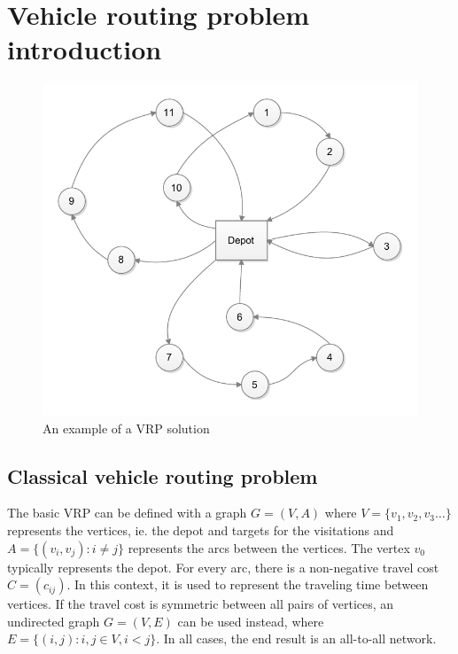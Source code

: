 \chapter{Vehicle routing problem introduction}
\label{chapter:background} 

\begin{figure}[h]
  \begin{center}
    \includegraphics{images/vrpbasic.pdf}
    \caption{An example of a VRP solution}
    \label{fig:simplenetwork}
  \end{center}
\end{figure}

\section{Classical vehicle routing problem}



The basic VRP can be defined with a graph $G = (V, A)$ where $V = \{v_1, v_2, v_3\dots\}$ represents the vertices, ie. the depot and targets for the visitations and $A = \{(v_i, v_j): i \neq j \}$ represents the arcs between the vertices. The vertex $v_0$ typically represents the depot. For every arc, there is a non-negative travel cost $C=(c_{ij})$. In this context, it is used to represent the traveling time between vertices. If the travel cost is symmetric between all pairs of vertices, an undirected graph $G = (V, E)$ can be used instead, where $E=\{(i, j) : i, j \in V, i < j\}$. In all cases, the end result is an all-to-all network. \cite{laporte2007you} 

